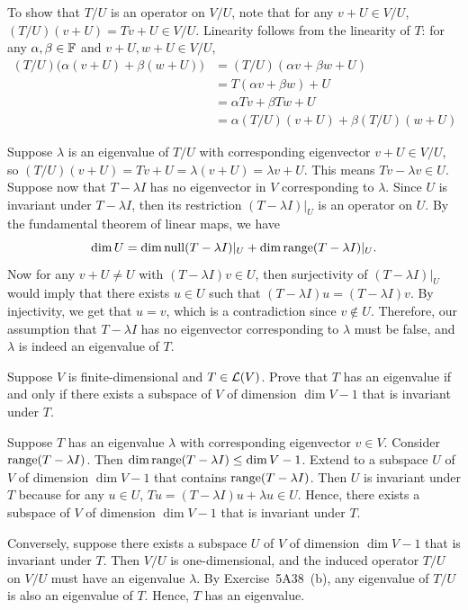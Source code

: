 \begin{exc}
\begin{solution}
\begin{parts}
  To show that $T/U$ is an operator on $V/U$, note that for any
  $v+U\in V/U$, $(T/U)(v+U)=Tv+U\in V/U$. Linearity follows from the linearity
  of $T$: for any $\alpha,\beta\in\mathbb{F}$ and $v+U,w+U\in V/U$,
  \begin{align*}
  (T/U)\bigl(\alpha(v+U)+\beta(w+U)\bigr) &= (T/U)(\alpha v+\beta w+U)\\
    &= T(\alpha v+\beta w)+U\\
    &= \alpha Tv+\beta Tw+U\\
    &= \alpha(T/U)(v+U)+\beta(T/U)(w+U)
  \end{align*}
\item Suppose $\lambda$ is an eigenvalue of $T/U$ with corresponding
  eigenvector $v+U\in V/U$, so
  $(T/U)(v+U)=Tv+U=\lambda(v+U)=\lambda v+U$. This means $Tv-\lambda v\in U$.
  Suppose now that $T-\lambda I$ has no eigenvector in $V$ corresponding to
  $\lambda$. Since $U$ is invariant under $T-\lambda I$, then its restriction
  $(T-\lambda I)|_U$ is an operator on $U$. By the fundamental theorem of
  linear maps, we have
  \[ \operatorname{dim} U = \operatorname{dim}\operatorname{null}(T-\lambda I)|_U+\operatorname{dim}\operatorname{range}(T-\lambda I)|_U. \]
  Now for any $v+U\ne U$ with $(T-\lambda I)v\in U$, then surjectivity of
  $(T-\lambda I)|_U$ would imply that there exists $u\in U$ such that
  $(T-\lambda I)u=(T-\lambda I)v$. By injectivity, we get that $u=v$, which is
  a contradiction since $v\notin U$. Therefore, our assumption that
  $T-\lambda I$ has no eigenvector corresponding to $\lambda$ must be false,
  and $\lambda$ is indeed an eigenvalue of $T$. \qedhere
\end{parts}
\end{solution}

\begin{exercise}
Suppose $V$ is finite-dimensional and $T\in\mathcal{L}(V)$. Prove that $T$ has an
eigenvalue if and only if there exists a subspace of $V$ of dimension
$\dim V-1$ that is invariant under $T$.
\end{exercise}
\begin{solution}
Suppose $T$ has an eigenvalue $\lambda$ with corresponding eigenvector
$v\in V$. Consider $\operatorname{range}(T-\lambda I)$. Then
$\operatorname{dim}\operatorname{range}(T-\lambda I)\le\operatorname{dim} V-1$. Extend to a subspace $U$ of $V$ of
dimension $\dim V-1$ that contains $\operatorname{range}(T-\lambda I)$. Then $U$ is invariant
under $T$ because for any $u\in U$, $Tu=(T-\lambda I)u+\lambda u\in U$. Hence,
there exists a subspace of $V$ of dimension $\dim V-1$ that is invariant under
$T$.

Conversely, suppose there exists a subspace $U$ of $V$ of dimension
$\dim V-1$ that is invariant under $T$. Then $V/U$ is one-dimensional, and the
induced operator $T/U$ on $V/U$ must have an eigenvalue $\lambda$. By
Exercise~5A38~(b), any eigenvalue of $T/U$ is also an eigenvalue of $T$. Hence,
$T$ has an eigenvalue.
\end{solution}


\end{exc}
